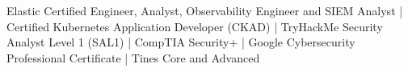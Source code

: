 Elastic Certified Engineer, Analyst, Observability Engineer and SIEM Analyst \hspace{1mm}|\hspace{1mm} Certified Kubernetes Application Developer (CKAD) \hspace{1mm}|\hspace{1mm} TryHackMe Security Analyst Level 1 (SAL1) \hspace{1mm}|\hspace{1mm} CompTIA Security+ \hspace{1mm}|\hspace{1mm} Google Cybersecurity Professional Certificate \hspace{1mm}|\hspace{1mm} Tines Core and Advanced
